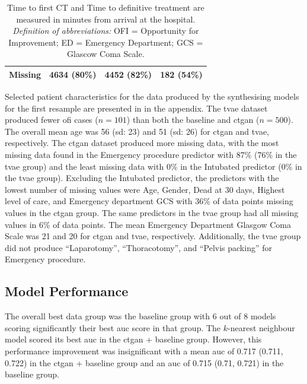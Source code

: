 \documentclass[12pt, a4paper]{article}
\begin{document}
\begin{table}[p]
{\begin{tabular}{lccc}
			\hspace{3mm}Missing                           & 4634 (80\%)       & 4452 (82\%)       & 182 (54\%)       \\
			\bottomrule
		\end{tabular}
	}
	\caption*{\small Time to first CT and Time to definitive treatment are measured in minutes from arrival at the hospital.\\
		\textit{Definition of abbreviations:} OFI = Opportunity for Improvement; ED = Emergency Department; GCS = Glascow Coma Scale.}
\end{table}

Selected patient characteristics for the data produced by the synthesising models for the first resample are presented
in  in the appendix. The \acrshort{tvae} dataset produced fewer \acrshort{ofi}
cases ($n=101$) than both the baseline and \acrshort{ctgan} ($n=500$). The overall mean age was 56 (\acrshort{sd}: 23)
and 51 (\acrshort{sd}: 26) for \acrshort{ctgan} and \acrshort{tvae}, respectively. The \acrshort{ctgan} dataset
produced more missing data, with the most missing data found in the Emergency procedure predictor with 87\% (76\% in
the \acrshort{tvae} group) and the least missing data with 0\% in the Intubated predictor (0\% in the \acrshort{tvae}
group). Excluding the Intubated predictor, the predictors with the lowest number of missing values were Age, Gender,
Dead at 30 days, Highest level of care, and Emergency department GCS with 36\% of data points missing values in the
\acrshort{ctgan} group. The same predictors in the \acrshort{tvae} group had all missing values in 6\% of data points.
The mean Emergency Department Glasgow Coma Scale was 21 and 20 for \acrshort{ctgan} and \acrshort{tvae}, respectively.
Additionally, the \acrshort{tvae} group did not produce ``Laparotomy'', ``Thoracotomy'', and ``Pelvis packing'' for
Emergency procedure.

\subsection{Model Performance}
The overall best data group was the baseline group with 6 out of 8 models scoring significantly their best
\acrshort{auc} score in that group. The $k$-nearest neighbour model scored its best \acrshort{auc} in the
\acrshort{ctgan} + baseline group. However, this performance improvement was insignificant with a mean \acrshort{auc}
of 0.717 (0.711, 0.722) in the \acrshort{ctgan} + baseline group and an \acrshort{auc} of 0.715 (0.71, 0.721) in the
baseline group.
\end{document}
